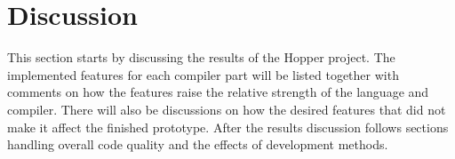 \chapter{Discussion}


This section starts by discussing the results of the Hopper project. The implemented features for each compiler part will be listed together with comments on how the features raise the relative strength of the language and compiler. There will also be discussions on how the desired features that did not make it affect the finished prototype. After the results discussion follows sections handling overall code quality and the effects of development methods.








